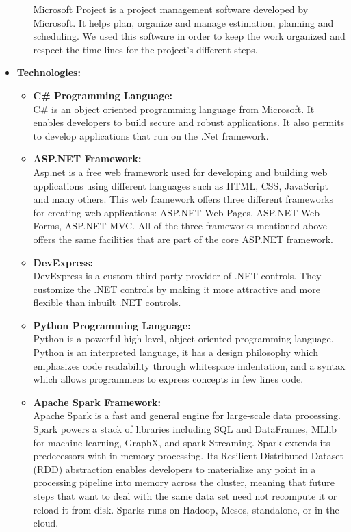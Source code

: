 \begin{appendix}
\begin{itemize}
\begin{itemize}
Microsoft Project is a project management software developed by Microsoft. It helps plan, organize
and manage estimation, planning and scheduling. We used this software in order to keep the work
organized and respect the time lines for the project's different steps.
\newpage
\end{itemize}
\item \textbf{Technologies:}
\begin{itemize}
\item \textbf{C\# Programming Language:}\\
C\# is an object oriented programming language from Microsoft. It enables
developers to build secure and robust applications. It also permits to develop applications that run on the .Net framework.
\item \textbf{ASP.NET Framework:}\\
Asp.net is a free web framework used for developing and building
web applications using different languages such as HTML, CSS, JavaScript and many others. This web framework offers three different frameworks for creating web applications: ASP.NET Web Pages, ASP.NET Web Forms, ASP.NET MVC. All of the three frameworks mentioned above offers the
same facilities that are part of the core ASP.NET framework.
\item \textbf{DevExpress:}\\
DevExpress is a custom third party provider of .NET controls. They customize the .NET controls by making it more attractive and more flexible than inbuilt .NET controls.
\item \textbf{Python Programming Language:}\\
Python is a powerful high-level, object-oriented programming language. Python is an interpreted language, it has a design philosophy which emphasizes code readability through whitespace indentation, and a syntax which allows programmers to express concepts in few lines code. 
\item \textbf{Apache Spark Framework:}\\
Apache Spark is a fast and general engine for large-scale data processing. Spark powers a stack of libraries including SQL and DataFrames, MLlib for machine learning, GraphX, and spark Streaming. Spark extends its predecessors with in-memory processing. Its Resilient Distributed Dataset (RDD) abstraction enables developers to materialize any point in a processing pipeline into memory across the cluster, meaning that future steps that want to deal with the same data set need not recompute it or reload it from disk. Sparks runs on Hadoop, Mesos, standalone, or in the cloud.

\end{itemize}
\end{itemize}
\end{appendix}

